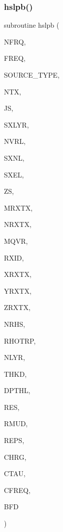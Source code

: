\subsubsection{\texorpdfstring{hslpb()}{hslpb()}}
{\footnotesize\ttfamily subroutine hslpb (\begin{DoxyParamCaption}\item[{integer}]{N\+F\+RQ,  }\item[{real, dimension(nfrq)}]{F\+R\+EQ,  }\item[{integer}]{S\+O\+U\+R\+C\+E\+\_\+\+T\+Y\+PE,  }\item[{integer}]{N\+TX,  }\item[{integer}]{JS,  }\item[{integer}]{S\+X\+L\+YR,  }\item[{integer}]{N\+V\+RL,  }\item[{real, dimension(nvrl)}]{S\+X\+NL,  }\item[{real, dimension(nvrl)}]{S\+X\+EL,  }\item[{real(kind=ql)}]{ZS,  }\item[{integer}]{M\+R\+X\+TX,  }\item[{integer, dimension(ntx)}]{N\+R\+X\+TX,  }\item[{integer}]{M\+Q\+VR,  }\item[{integer, dimension(mrxtx,ntx)}]{R\+X\+ID,  }\item[{real, dimension(mrxtx,ntx,mqvr)}]{X\+R\+X\+TX,  }\item[{real, dimension(mrxtx,ntx,mqvr)}]{Y\+R\+X\+TX,  }\item[{real, dimension(mrxtx,ntx)}]{Z\+R\+X\+TX,  }\item[{integer}]{N\+R\+HS,  }\item[{real, dimension(nrhs)}]{R\+H\+O\+T\+RP,  }\item[{integer}]{N\+L\+YR,  }\item[{real(kind=ql), dimension(nlyr)}]{T\+H\+KD,  }\item[{real(kind=ql), dimension(nlyr)}]{D\+P\+T\+HL,  }\item[{real, dimension(nlyr)}]{R\+ES,  }\item[{real(kind=ql), dimension(0\+:nlyr)}]{R\+M\+UD,  }\item[{real, dimension(nlyr)}]{R\+E\+PS,  }\item[{real, dimension(nlyr)}]{C\+H\+RG,  }\item[{real, dimension(nlyr)}]{C\+T\+AU,  }\item[{real, dimension(nlyr)}]{C\+F\+R\+EQ,  }\item[{complex, dimension(nfrq,mrxtx,ntx,3)}]{B\+FD }\end{DoxyParamCaption})}

